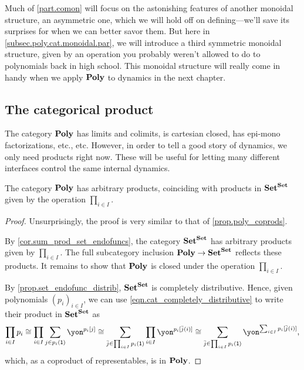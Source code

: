 \documentclass[Book-Poly]{subfiles}
\begin{document}
Much of \cref{part.comon} will focus on the astonishing features of another monoidal structure, an asymmetric one, which we will hold off on defining---we'll save its surprises for when we can better savor them.
But here in \cref{subsec.poly.cat.monoidal.par}, we will introduce a third symmetric monoidal structure, given by an operation you probably weren't allowed to do to polynomials back in high school.
This monoidal structure will really come in handy when we apply $\mathbf{Poly}$ to dynamics in the next chapter.

\subsection{The categorical product} \label{subsec.poly.cat.monoidal.prod}
The category $\mathbf{Poly}$ has limits and colimits, is cartesian closed, has epi-mono factorizations, etc., etc. However, in order to tell a good story of dynamics, we only need products right now. These will be useful for letting many different interfaces control the same internal dynamics.

\begin{proposition}\label{prop.poly_prods}
The category $\mathbf{Poly}$ has arbitrary products, coinciding with products in $\mathbf{Set}^{\mathbf{Set}}$ given by the operation $\prod_{i \in I}$.
\end{proposition}
\begin{proof}
Unsurprisingly, the proof is very similar to that of \cref{prop.poly_coprods}.

By \cref{cor.sum_prod_set_endofuncs}, the category $\mathbf{Set}^{\mathbf{Set}}$ has arbitrary products given by $\prod_{i \in I}$.
The full subcategory inclusion $\mathbf{Poly} \to \mathbf{Set}^{\mathbf{Set}}$ reflects these products.
It remains to show that $\mathbf{Poly}$ is closed under the operation $\prod_{i \in I}$.

By \cref{prop.set_endofunc_distrib}, $\mathbf{Set}^{\mathbf{Set}}$ is completely distributive.
Hence, given polynomials $(p_i)_{i \in I}$, we can use \eqref{eqn.cat_completely_distributive} to write their product in $\mathbf{Set}^{\mathbf{Set}}$ as
\begin{equation} \label{eqn.poly_prod}
    \prod_{i \in I} p_i \iso \prod_{i \in I} \sum_{j \in p_i(\1)} \yon^{p_i[j]} \iso \sum_{\bar{j} \in \prod_{i \in I} p_i(\1)} \prod_{i \in I} \yon^{p_i[\bar{j}(i)]} \iso \sum_{\bar{j} \in \prod_{i \in I} p_i(\1)} \yon^{\sum_{i \in I} p_i[\bar{j}(i)]},
\end{equation}
which, as a coproduct of representables, is in $\mathbf{Poly}$.
\end{proof}
\end{document}
